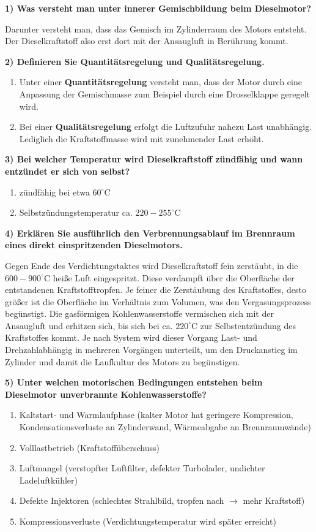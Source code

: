 \textbf{1) Was versteht man unter innerer Gemischbildung beim
Dieselmotor?}

Darunter versteht man, dass das Gemisch im Zylinderraum des Motors
entsteht. Der Dieselkraftstoff also erst dort mit der Ansaugluft in
Berührung kommt.

\textbf{2) Definieren Sie Quantitätsregelung und Qualitätsregelung.}

\begin{enumerate}
\item
  Unter einer \textbf{Quantitätsregelung} versteht man, dass der Motor
  durch eine Anpassung der Gemischmasse zum Beispiel durch eine
  Drosselklappe geregelt wird.
\item
  Bei einer \textbf{Qualitätsregelung} erfolgt die Luftzufuhr nahezu
  Last unabhängig. Lediglich die Kraftstoffmasse wird mit zunehmender
  Last erhöht.
\end{enumerate}

\textbf{3) Bei welcher Temperatur wird Dieselkraftstoff zündfähig und
wann entzündet er sich von selbst?}

\begin{enumerate}
\item
  zündfähig bei etwa $60^\circ\text{C}$
\item
  Selbstzündungstemperatur ca. $220 - 255^\circ\text{C}$
\end{enumerate}

\textbf{4) Erklären Sie ausführlich den Verbrennungsablauf im Brennraum
eines direkt einspritzenden Dieselmotors.}

Gegen Ende des Verdichtungstaktes wird Dieselkraftstoff fein zerstäubt,
in die $600 - 900^\circ\text{C}$ heiße Luft eingespritzt. Diese
verdampft über die Oberfläche der entstandenen Kraftstofftropfen. Je
feiner die Zerstäubung des Kraftstoffes, desto größer ist die Oberfläche
im Verhältnis zum Volumen, was den Vergasungsprozess begünstigt. Die
gasförmigen Kohlenwasserstoffe vermischen sich mit der Ansaugluft und
erhitzen sich, bis sich bei ca. $220^\circ\text{C}$ zur
Selbstentzündung des Kraftstoffes kommt. Je nach System wird dieser
Vorgang Last- und Drehzahlabhängig in mehreren Vorgängen unterteilt, um
den Druckanstieg im Zylinder und damit die Laufkultur des Motors zu
begünstigen.

\textbf{5) Unter welchen motorischen Bedingungen entstehen beim
Dieselmotor unverbrannte Kohlenwasserstoffe?}

\begin{enumerate}
\item
  Kaltstart- und Warmlaufphase (kalter Motor hat geringere Kompression,
  Kondensationsverluste an Zylinderwand, Wärmeabgabe an Brennraumwände)
\item
  Volllastbetrieb (Kraftstoffüberschuss)
\item
  Luftmangel (verstopfter Luftfilter, defekter Turbolader, undichter
  Ladeluftkühler)
\item
  Defekte Injektoren (schlechtes Strahlbild, tropfen nach $\to$ mehr
  Kraftstoff)
\item
  Kompressionsverluste (Verdichtungstemperatur wird später erreicht)
\end{enumerate}

